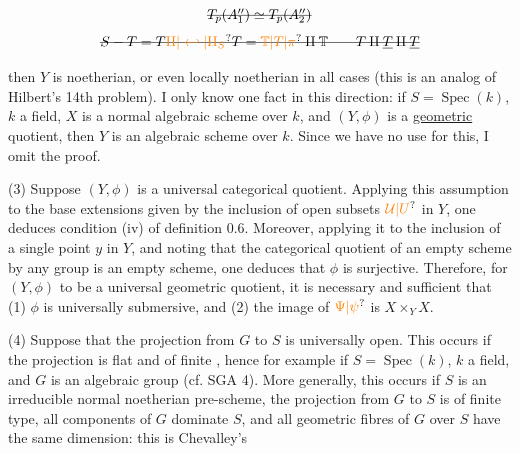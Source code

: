 \[
\handwritten{\deleted{T_p(A''_1)\simeq T_p(A''_{2})}}
\]
\[
\handwritten{\deleted{S-T=T\unsure{\amalg|\hookleftarrow|\amalg_S}T=\unsure{\mathbb T|T|\pi}\amalg \mathbb T\qquad T\amalg\underline T\amalg\underline T}}
\]


\margin{\handwritten{$\Vert$}} then $Y$ is noetherian, or even locally noetherian in all cases (this is an analog of Hilbert's 14th problem). I only know one fact in this direction: if $S=\operatorname{Spec}(k)$, $k$ a field, $X$ is a normal algebraic scheme over $k$, and $(Y,\phi)$ is a \uline{geometric} quotient, \margin{\handwritten{$\Vert$}} then $Y$ is an algebraic scheme over $k$. Since we have no use for this, I omit the proof.

(3) Suppose $(Y,\phi)$ is a universal categorical quotient. Applying this assumption to the base extensions given by the inclusion of open subsets $\handwritten{\unsure{\mathcal U|U}}$ in $Y$, one deduces condition (iv) of definition 0.6. Moreover, applying it to the inclusion of a single point $y$ in $Y$, and noting that the categorical quotient of an empty scheme by any group is an empty scheme, one deduces that $\phi$ is surjective. Therefore, for $(Y,\phi)$ to be a universal geometric quotient, it is necessary and sufficient that (1) $\phi$ is universally submersive, and (2) the image of $\unsure{\Psi|\psi}$ is $X\times_Y X$.

(4) Suppose that the projection from $G$ to $S$ is universally open. This occurs if the projection is flat and of  finite ,
hence for example if $S=\operatorname{Spec}(k)$, $k$ a field, and $G$ is an algebraic group (cf. SGA 4). More generally, this occurs if $S$ is an irreducible normal noetherian pre-scheme, the projection from $G$ to $S$ is  of finite type, all components of $G$ dominate $S$, and all geometric fibres of $G$ over $S$ have the same dimension: this is Chevalley's

